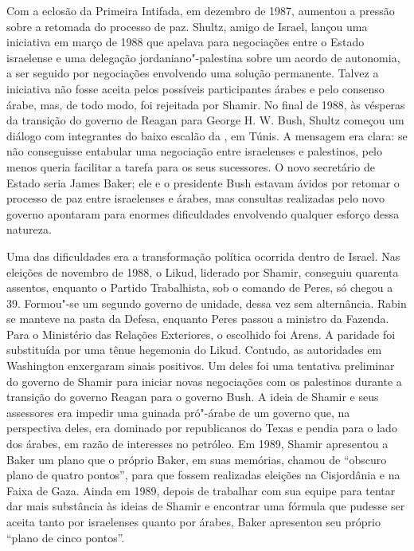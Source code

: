 Com a eclosão da Primeira Intifada, em dezembro de 1987, aumentou a
pressão sobre a retomada do processo de paz. Shultz, amigo de Israel,
lançou uma iniciativa em março de 1988 que apelava para negociações
entre o Estado israelense e uma delegação jordaniano"-palestina sobre um acordo de
autonomia, a ser seguido por negociações envolvendo uma solução
permanente. Talvez a iniciativa não fosse aceita pelos possíveis
participantes árabes e pelo consenso árabe, mas, de todo modo, foi
rejeitada por Shamir. No final de 1988, às vésperas da transição do
governo de Reagan para George H. W. Bush, Shultz começou um diálogo com
integrantes do baixo escalão da , em Túnis. A mensagem era clara: se
não conseguisse entabular uma negociação entre israelenses e palestinos,
pelo menos queria facilitar a tarefa para os seus sucessores. O novo
secretário de Estado seria James Baker; ele e o presidente Bush estavam
ávidos por retomar o processo de paz entre israelenses e árabes, mas
consultas realizadas pelo novo governo apontaram para enormes
dificuldades envolvendo qualquer esforço dessa natureza.

Uma das dificuldades era a transformação política ocorrida dentro de
Israel. Nas eleições de novembro de 1988, o Likud, liderado por Shamir,
conseguiu quarenta assentos, enquanto o Partido Trabalhista, sob o comando de
Peres, só chegou a 39. Formou"-se um segundo governo de unidade, dessa
vez sem alternância. Rabin se manteve na pasta da Defesa, enquanto Peres
passou a ministro da Fazenda. Para o Ministério das Relações Exteriores,
o escolhido foi Arens. A paridade foi substituída por uma tênue
hegemonia do Likud. Contudo, as autoridades em Washington enxergaram
sinais positivos. Um deles foi uma tentativa preliminar do governo de
Shamir para iniciar novas negociações com os palestinos durante a
transição do governo Reagan para o governo Bush. A ideia de Shamir e
seus assessores era impedir uma guinada pró"-árabe de um governo que, na
perspectiva deles, era dominado por republicanos do Texas e pendia para
o lado dos árabes, em razão de interesses no petróleo. Em 1989, Shamir
apresentou a Baker um plano que o próprio Baker, em suas memórias,
chamou de ``obscuro plano de quatro pontos'', para que fossem realizadas
eleições na Cisjordânia e na Faixa de Gaza. Ainda em 1989, depois de
trabalhar com sua equipe para tentar dar mais substância às ideias de
Shamir e encontrar uma fórmula que pudesse ser aceita tanto por
israelenses quanto por árabes, Baker apresentou seu próprio ``plano de
cinco pontos''.

